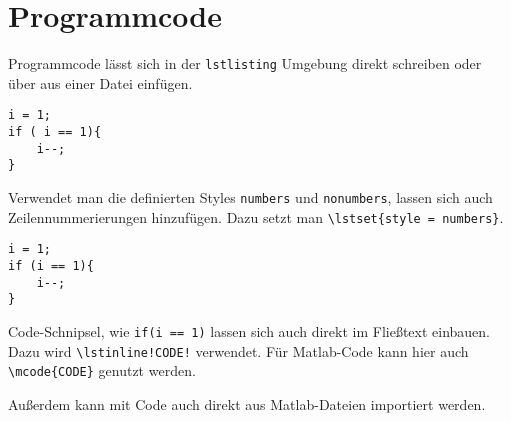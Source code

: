 \chapter{Programmcode}
Programmcode lässt sich in der \verb+lstlisting+ Umgebung direkt schreiben oder über \verb++ aus einer Datei einfügen. 

\begin{lstlisting}
i = 1; 
if ( i == 1){
	i--;
}
\end{lstlisting}


Verwendet man die definierten Styles \texttt{numbers} und \texttt{nonumbers}, lassen sich auch Zeilennummerierungen hinzufügen. Dazu setzt man \verb+\lstset{style = numbers}+.
\lstset{style = numbers}
\begin{lstlisting}
i = 1; 
if (i == 1){
	i--;
}
\end{lstlisting}

Code-Schnipsel, wie \lstinline!if(i == 1)! lassen sich auch direkt im Fließtext einbauen. Dazu wird \verb+\lstinline!CODE!+ verwendet.
Für Matlab-Code kann hier auch \verb+\mcode{CODE}+ genutzt werden. 

Außerdem kann mit \verb++ Code auch direkt aus Matlab-Dateien importiert werden. 
